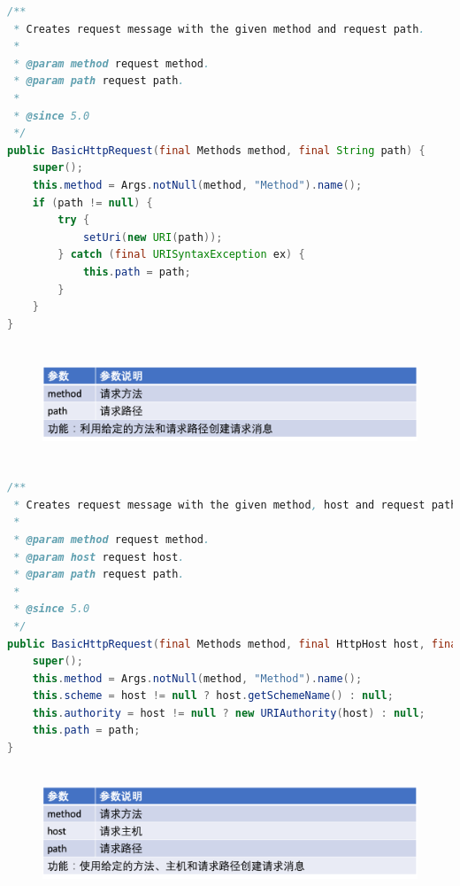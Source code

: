 \documentclass{article}
\begin{document}
	\begin{lstlisting}[language={java}]
/**
 * Creates request message with the given method and request path.
 *
 * @param method request method.
 * @param path request path.
 *
 * @since 5.0
 */
public BasicHttpRequest(final Methods method, final String path) {
    super();
    this.method = Args.notNull(method, "Method").name();
    if (path != null) {
        try {
            setUri(new URI(path));
        } catch (final URISyntaxException ex) {
            this.path = path;
        }
    }
}
	\end{lstlisting}
	\begin{figure}[H]
		\centering
		\includegraphics[height = 3.5cm, width = 18cm]{pics/18_Request_table_1_4.png}	
	\end{figure}

	\begin{lstlisting}[language={java}]
/**
 * Creates request message with the given method, host and request path.
 *
 * @param method request method.
 * @param host request host.
 * @param path request path.
 *
 * @since 5.0
 */
public BasicHttpRequest(final Methods method, final HttpHost host, final String path) {
    super();
    this.method = Args.notNull(method, "Method").name();
    this.scheme = host != null ? host.getSchemeName() : null;
    this.authority = host != null ? new URIAuthority(host) : null;
    this.path = path;
}

	\end{lstlisting}
	\begin{figure}[H]
		\centering
		\includegraphics[height = 3.8cm, width = 18cm]{pics/19_Request_table_2_5.png}	
	\end{figure}
\end{document}

